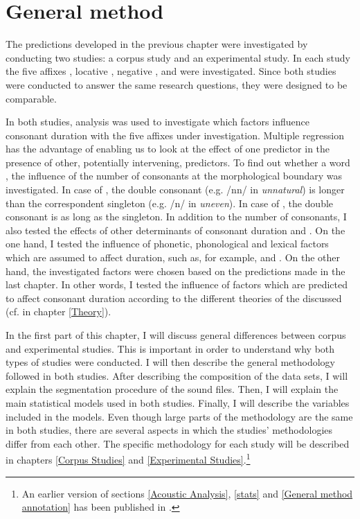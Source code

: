 \chapter{General method} \label{General Method}



The predictions developed in the previous chapter were investigated by conducting two studies: a corpus study and an experimental study. In each study the five affixes , locative , negative ,  and  were investigated. 
Since both studies were conducted to answer the same research questions, they were designed to be comparable.  

In both studies,  analysis was used to investigate which factors influence consonant duration with the five affixes under investigation. Multiple regression has the advantage of enabling us to look at the effect of one predictor in the presence of other, potentially intervening, predictors.  
To find out whether a word , the influence of the number of consonants at the morphological boundary was investigated. In case of , the double consonant (e.g. /nn/ in \textit{unnatural}) is longer than the correspondent singleton (e.g. /n/ in \textit{uneven}). In case of , the double consonant is as long as the singleton. In addition to the number of consonants, I also tested the effects of other determinants of consonant duration and . On the one hand, I tested the influence of phonetic, phonological and lexical factors which are assumed to affect duration, such as, for example,  and . On the other hand, the investigated factors were chosen based on the predictions made in the last chapter. In other words, I tested the influence of factors which are predicted to affect consonant duration according to the different theories of the  discussed (cf.  in chapter \ref{Theory}). 




In the first part of this chapter, I will discuss general differences between corpus and experimental studies. This is important in order to understand why both types of studies were conducted. I will then describe the general methodology followed in both studies. After describing the composition of the data sets, I will explain the segmentation procedure of the sound files. Then, I will explain the main statistical models used in both studies. Finally, I will describe the variables included in the models.
Even though large parts of the methodology are the same in both studies, there are several aspects in which the studies' methodologies differ from each other. The specific methodology for each study will be described in chapters \ref{Corpus Studies} and \ref{Experimental Studies}.\footnote{An earlier version of sections \ref{Acoustic Analysis}, \ref{stats}  and \ref{General method annotation} has been published in \cite{BenHedia.2017}.}



